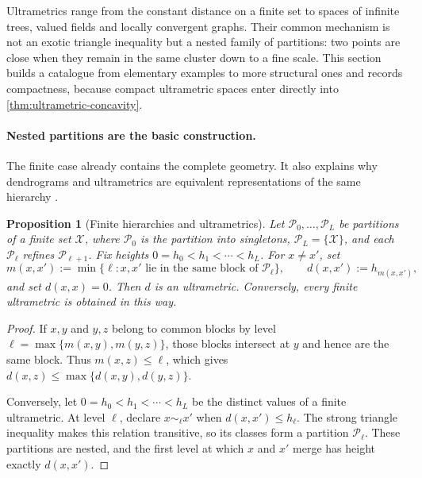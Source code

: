 \documentclass[11pt,a4paper]{article}
\newtheorem{proposition}[theorem]{Proposition}
\theoremstyle{definition}
\theoremstyle{remark}
\begin{document}
Ultrametrics range from the constant distance on a finite set to spaces of
infinite trees, valued fields and locally convergent graphs.  Their common
mechanism is not an exotic triangle inequality but a nested family of
partitions: two points are close when they remain in the same cluster down to
a fine scale.  This section builds a catalogue from elementary examples to
more structural ones and records compactness, because compact ultrametric
spaces enter directly into \cref{thm:ultrametric-concavity}.

\paragraph{Nested partitions are the basic construction.}
The finite case already contains the complete geometry.  It also explains
why dendrograms and ultrametrics are equivalent representations of the same
hierarchy \citep{CarlssonMemoli2010}.

\begin{proposition}[Finite hierarchies and ultrametrics]
\label{prop:nested-partition-ultrametric}
Let \(\mathscr P_0,\ldots,\mathscr P_L\) be partitions of a finite set
\(\mathcal X\), where \(\mathscr P_0\) is the partition into singletons,
\(\mathscr P_L=\{\mathcal X\}\), and each \(\mathscr P_\ell\) refines
\(\mathscr P_{\ell+1}\).  Fix heights
\(0=h_0<h_1<\cdots<h_L\).  For \(x\neq x'\), set
\begin{equation}
  m(x,x'):=\min\{\ell:x,x'\text{ lie in the same block of }
  \mathscr P_\ell\},
  \qquad d(x,x'):=h_{m(x,x')},
  \label{eq:partition-ultrametric}
\end{equation}
and set \(d(x,x)=0\).  Then \(d\) is an ultrametric.  Conversely, every
finite ultrametric is obtained in this way.
\end{proposition}

\begin{proof}
If \(x,y\) and \(y,z\) belong to common blocks by level
\(\ell=\max\{m(x,y),m(y,z)\}\), those blocks intersect at \(y\) and hence are
the same block.  Thus \(m(x,z)\leq\ell\), which gives
\(d(x,z)\leq\max\{d(x,y),d(y,z)\}\).

Conversely, let \(0=h_0<h_1<\cdots<h_L\) be the distinct values of a finite
ultrametric.  At level \(\ell\), declare \(x\sim_\ell x'\) when
\(d(x,x')\leq h_\ell\).  The strong triangle inequality makes this relation
transitive, so its classes form a partition \(\mathscr P_\ell\).  These
partitions are nested, and the first level at which \(x\) and \(x'\) merge
has height exactly \(d(x,x')\).
\end{proof}
\end{document}
